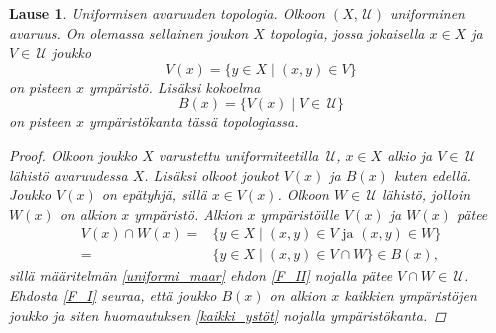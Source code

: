 \documentclass[12pt,a4paper,leqno]{report}
\newcommand{\U}{\,\mathcal{U}}
\theoremstyle{plain}
\newtheorem{lause}[equation]{Lause}
\theoremstyle{definition}
\theoremstyle{remark}
\begin{document}
\begin{lause}\label{uniformi topologia}
Uniformisen avaruuden topologia.
Olkoon $(X,\U)$ uniforminen avaruus.
On olemassa sellainen joukon $X$ topologia, 
jossa jokaisella $x\in X$ ja $V\in\U$ joukko
$$V(x)=\{ y\in X\mid (x,y)\in V \}$$
on pisteen $x$ ympäristö. Lisäksi kokoelma
$$B(x)=\{ V(x)\mid V\in\U \}$$
on pisteen $x$ ympäristökanta tässä topologiassa.
\begin{proof}
Olkoon joukko $X$ varustettu uniformiteetilla $\U$, 
$x\in X$ alkio ja $V\in\U$ lähistö avaruudessa $X$. Lisäksi olkoot joukot $V(x)$ ja $B(x)$ kuten edellä. 
%
Joukko $V(x)$ on epätyhjä, sillä $x\in V(x)$.
Olkoon $W\in\U$ lähistö, jolloin $W(x)$ on alkion $x$ ympäristö. 
Alkion $x$ ympäristöille $V(x)$ ja $W(x)$ pätee
\begin{align*}
V(x)\cap W(x) =&\{ y\in X\mid (x,y)\in V \text{ ja } (x,y)\in W \}\\
=&\{ y\in X\mid (x,y)\in V\cap W \}
\in B(x),
\end{align*} 
sillä määritelmän \ref{uniformi_maar} ehdon \ref{F_II} 
nojalla pätee $ V\cap W \in \U$. 
Ehdosta \ref{F_I} seuraa, että 
joukko $B(x)$ on alkion $x$ kaikkien ympäristöjen joukko ja siten 
huomautuksen \ref{kaikki_ystöt} nojalla ympäristökanta.
\end{proof}
\end{lause}
\end{document}

